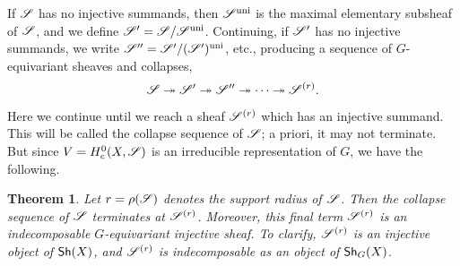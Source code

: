 \documentclass[letter]{amsart}
\newtheorem{thm}{Theorem}[section]
\theoremstyle{definition}
\theoremstyle{remark}
\numberwithin{thm}{section}
\numberwithin{equation}{section}
\DeclareMathOperator{\uni}{uni}
\begin{document}
If ${\mathscr{S}}$ has no injective summands, then $\sheaf{S}^{\uni}$ is the maximal elementary subsheaf of ${\mathscr{S}}$, and we define $\sheaf{S}' = \sheaf{S} / \sheaf{S}^{\uni}$.  Continuing, if ${\mathscr{S}}'$ has no injective summands, we write $\sheaf{S}'' = \sheaf{S}' / (\sheaf{S}')^{\uni}$, etc., producing a sequence of $G$-equivariant sheaves and collapses,
$${\mathscr{S}} \twoheadrightarrow {\mathscr{S}}' \twoheadrightarrow {\mathscr{S}}'' \twoheadrightarrow \cdots \twoheadrightarrow {\mathscr{S}}^{(r)}.$$
Here we continue until we reach a sheaf ${\mathscr{S}}^{(r)}$ which has an injective summand.  This will be called the collapse sequence of ${\mathscr{S}}$; a priori, it may not terminate.  But since $V = H_c^0(X, {\mathscr{S}})$ is an irreducible representation of $G$, we have the following.
\begin{thm}
Let $r = \rho({\mathscr{S}})$ denotes the support radius of ${\mathscr{S}}$.  Then the collapse sequence of ${\mathscr{S}}$ terminates at ${\mathscr{S}}^{(r)}$.  Moreover, this final term ${\mathscr{S}}^{(r)}$ is an indecomposable $G$-equivariant injective sheaf.  To clarify, ${\mathscr{S}}^{(r)}$ is an injective object of ${\mathsf{Sh}}(X)$, and ${\mathscr{S}}^{(r)}$ is indecomposable as an object of ${\mathsf{Sh}}_G(X)$.
\end{thm}
\end{document}
